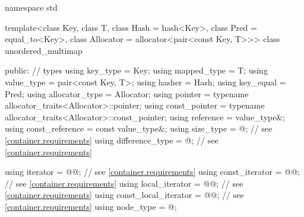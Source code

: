 %
\begin{codeblock}
namespace std {
  template<class Key,
           class T,
           class Hash = hash<Key>,
           class Pred = equal_to<Key>,
           class Allocator = allocator<pair<const Key, T>>>
  class unordered_multimap {
  public:
    // types
    using key_type             = Key;
    using mapped_type          = T;
    using value_type           = pair<const Key, T>;
    using hasher               = Hash;
    using key_equal            = Pred;
    using allocator_type       = Allocator;
    using pointer              = typename allocator_traits<Allocator>::pointer;
    using const_pointer        = typename allocator_traits<Allocator>::const_pointer;
    using reference            = value_type&;
    using const_reference      = const value_type&;
    using size_type            = @\impdef@; // see \ref{container.requirements}
    using difference_type      = @\impdef@; // see \ref{container.requirements}

    using iterator             = @@; // see \ref{container.requirements}
    using const_iterator       = @@; // see \ref{container.requirements}
    using local_iterator       = @@; // see \ref{container.requirements}
    using const_local_iterator = @@; // see \ref{container.requirements}
    using node_type            = @\unspec@;

}}
\end{codeblock}
